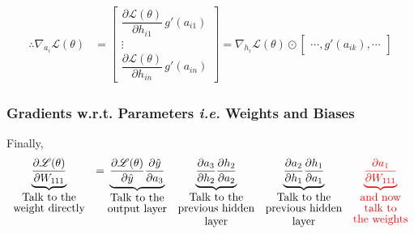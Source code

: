 \documentclass[11pt, a4paper]{article}
\begin{document}
\begin{align*}
\therefore \nabla_{a_i} \mathscr{L}(\theta) &=
\begin{bmatrix}
\dfrac{\partial \mathscr{L}(\theta)}{\partial h_{i1}} \, g'(a_{i1}) \\
\vdots \\
\dfrac{\partial \mathscr{L}(\theta)}{\partial h_{in}} \, g'(a_{in})
\end{bmatrix}
= \nabla_{h_i} \mathscr{L}(\theta) \odot \begin{bmatrix}
\cdots, g'(a_{ik}), \cdots
\end{bmatrix}
\end{align*}


\subsubsection{Gradients w.r.t. Parameters \textit{i.e.} Weights and Biases}

\vspace{0.3cm}

\noindent

Finally, 
\[
\begin{array}{ccccc}
\underbrace{\dfrac{\partial \mathscr{L}(\theta)}{\partial W_{111}}}_{\shortstack{Talk to the\\weight directly}}
&=
\underbrace{\dfrac{\partial \mathscr{L}(\theta)}{\partial \hat{y}} \dfrac{\partial \hat{y}}{\partial a_3}}_{\shortstack{Talk to the\\output layer}}
&
\underbrace{\dfrac{\partial a_3}{\partial h_2} \dfrac{\partial h_2}{\partial a_2}}_{\shortstack{Talk to the\\previous hidden\\layer}}
&
\underbrace{\dfrac{\partial a_2}{\partial h_1} \dfrac{\partial h_1}{\partial a_1}}_{\shortstack{Talk to the\\previous hidden\\layer}}
&
\textcolor{red}{
\underbrace{\dfrac{\partial a_1}{\partial W_{111}}}_{\shortstack{and now\\talk to\\the weights}}
}
\end{array}
\]
\end{document}
